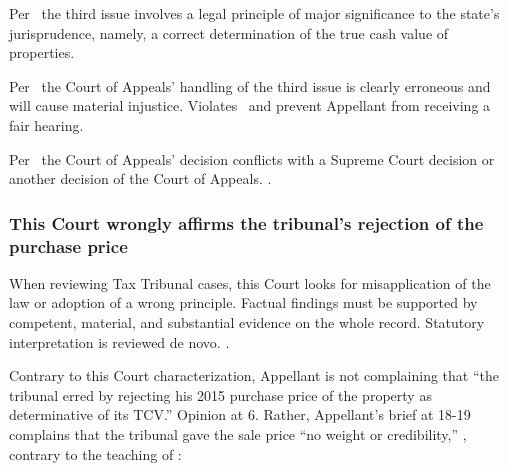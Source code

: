 \documentclass[12pt,\documentclassflag]{michiganCourtOfAppealsBrief}
\begin{document}
Per \cite{MCR 7.305(B)(3)}\ the third issue involves a legal principle of major significance to the state's jurisprudence, namely, a correct determination of the true cash value of properties. 

Per \cite{MCR 7.305(B)(5a)}\ the Court of Appeals' handling of the third issue is clearly erroneous and will cause material injustice. Violates \cite{Jones & Laughlin}\ and prevent Appellant from receiving a fair hearing.

Per \cite{MCR 7.305(B)(5b)}\ the Court of Appeals' decision conflicts with a Supreme Court decision or another decision of the Court of Appeals. \cite{Jones & Laughlin}.


\subsubsection{This Court wrongly affirms the tribunal's rejection of the purchase price}

When reviewing Tax Tribunal cases, this Court looks for misapplication of the law or adoption of a wrong principle. Factual findings must be supported by competent, material, and substantial evidence on the whole record. Statutory interpretation is reviewed de novo. .


Contrary to this Court characterization,
Appellant is not complaining that ``the tribunal erred by rejecting his 2015 purchase price of the
property as determinative of its TCV.'' Opinion at 6. Rather, Appellant's brief at 18-19 complains that the tribunal gave the sale price ``no weight or credibility,'' , contrary to the teaching of :
\end{document}
